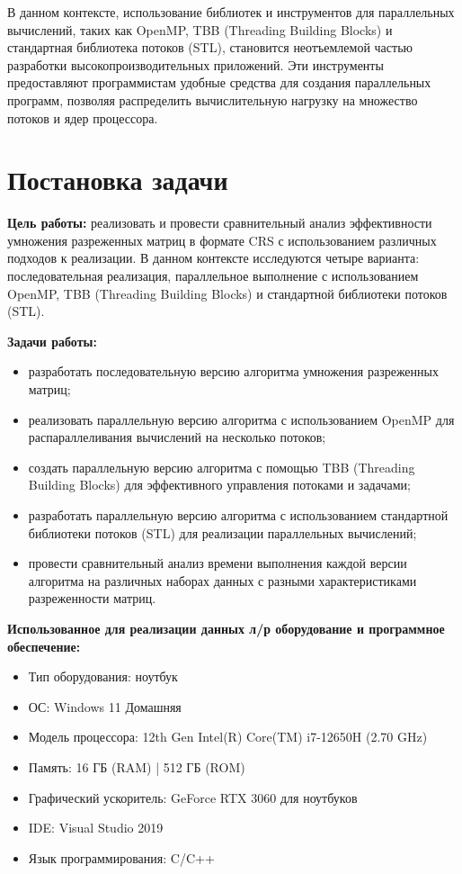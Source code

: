 \documentclass[a4paper, 14pt]{article}
\theoremstyle{plain}
\begin{document}
В данном контексте, использование библиотек и инструментов для параллельных вычислений, таких как OpenMP, TBB (Threading Building Blocks) и стандартная библиотека потоков (STL), становится неотъемлемой частью разработки высокопроизводительных приложений. Эти инструменты предоставляют программистам удобные средства для создания параллельных программ, позволяя распределить вычислительную нагрузку на множество потоков и ядер процессора.

\newpage
\section*{\centering Постановка задачи}
\textbf{Цель работы:} реализовать и провести сравнительный анализ эффективности умножения разреженных матриц в формате CRS с использованием различных подходов к реализации. В данном контексте исследуются четыре варианта: последовательная реализация, параллельное выполнение с использованием OpenMP, TBB (Threading Building Blocks) и стандартной библиотеки потоков (STL). 

\textbf{Задачи работы:}
\vspace{-1em}
\begin{itemize}[leftmargin=3em]
	\setlength\itemsep{0cm}
	\item разработать последовательную версию алгоритма умножения разреженных матриц;
	\item реализовать параллельную версию алгоритма с использованием OpenMP для распараллеливания вычислений на несколько потоков;
	\item создать параллельную версию алгоритма с помощью TBB (Threading Building Blocks) для эффективного управления потоками и задачами;
	\item разработать параллельную версию алгоритма с использованием стандартной библиотеки потоков (STL) для реализации параллельных вычислений;
	\item провести сравнительный анализ времени выполнения каждой версии алгоритма на различных наборах данных с разными характеристиками разреженности матриц.
\end{itemize}

\textbf{Использованное для реализации данных л/р оборудование и программное обеспечение:} 
\vspace{-1em}
\begin{itemize}[leftmargin=3em]
	\setlength\itemsep{0cm}
	\item Тип оборудования: ноутбук
	\item ОС: Windows 11 Домашняя
	\item Модель процессора: 12th Gen Intel(R) Core(TM) i7-12650H (2.70 GHz)
	\item Память: 16 ГБ (RAM) | 512 ГБ (ROM)
	\item Графический ускоритель: GeForce RTX 3060 для ноутбуков
	\item IDE: Visual Studio 2019
	\item Язык программирования: C/C++
\end{itemize}
\end{document}
